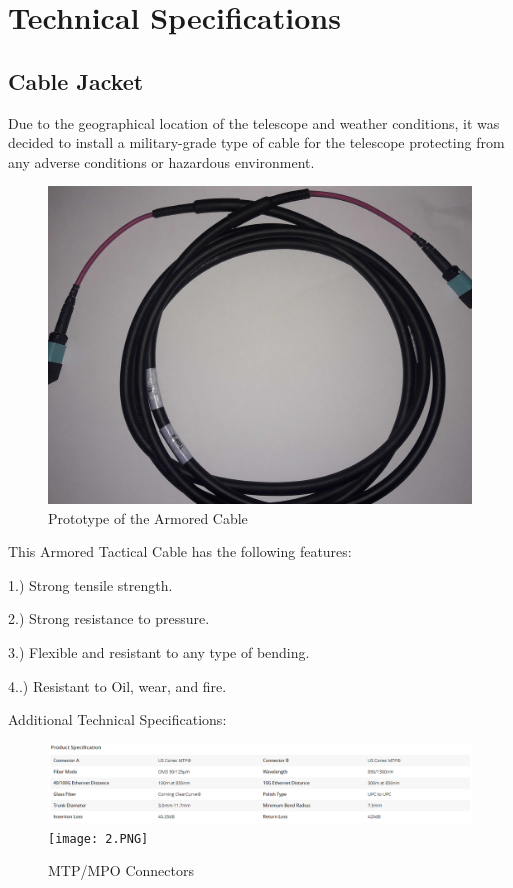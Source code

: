 \section{Technical Specifications}

\subsection{Cable Jacket}

Due to the geographical location of the telescope and weather conditions, it was decided to install a military-grade type of cable for the telescope protecting from any adverse conditions or hazardous environment. 

\begin{figure}
  \includegraphics[width=\textwidth]{images/mtp_militar_cable.jpg}
  \caption{Prototype of the Armored Cable}
  \label{fig:jlsimon}
\end{figure}

This Armored Tactical Cable has the following features:

1.) Strong tensile strength.

2.) Strong resistance to pressure.

3.) Flexible and resistant to any type of bending.

4..) Resistant to Oil, wear, and fire.


Additional Technical Specifications:

\begin{figure}
  \includegraphics[width=\textwidth]{images/2.PNG}
  \texttt{[image: 2.PNG]}
  \caption{MTP/MPO Connectors}
  \label{fig:jlsimon}
\end{figure}



